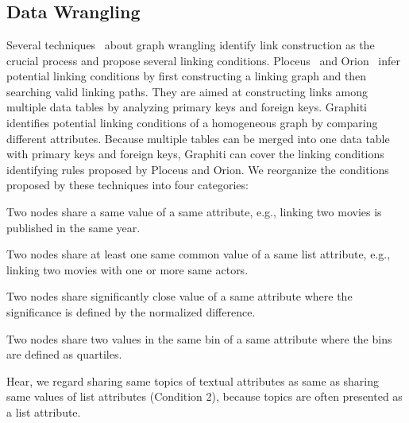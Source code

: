 \section{\ApproachName}

\subsection{Data Wrangling}
Several techniques~\cite{DBLP:journals/ivs/LiuNS14, DBLP:journals/ivs/HeerP14, DBLP:journals/tvcg/SrinivasanPEB18} about graph wrangling identify link construction as the crucial process and propose several linking conditions.
Ploceus~\cite{DBLP:journals/ivs/LiuNS14} and Orion~\cite{DBLP:journals/ivs/HeerP14} infer potential linking conditions by first constructing a linking graph and then searching valid linking paths. They are aimed at constructing links among multiple data tables by analyzing primary keys and foreign keys.
Graphiti~\cite{DBLP:journals/tvcg/SrinivasanPEB18} identifies potential linking conditions of a homogeneous graph by comparing different attributes.
Because multiple tables can be merged into one data table with primary keys and foreign keys, Graphiti can cover the linking conditions identifying rules proposed by Ploceus and Orion. %
We reorganize the conditions proposed by these techniques into four categories:
\begin{compactenum}
    \item Two nodes share a same value of a same attribute, e.g., linking two movies is published in the same year.
    \item Two nodes share at least one same common value of a same list attribute, e.g., linking two movies with one or more same actors.
    \item Two nodes share significantly close value of a same attribute where the significance is defined by the normalized difference.
    \item Two nodes share two values in the same bin of a same attribute where the bins are defined as quartiles.
\end{compactenum}
Hear, we regard sharing same topics of textual attributes as same as sharing same values of list attributes (Condition 2), because topics are often presented as a list attribute.

